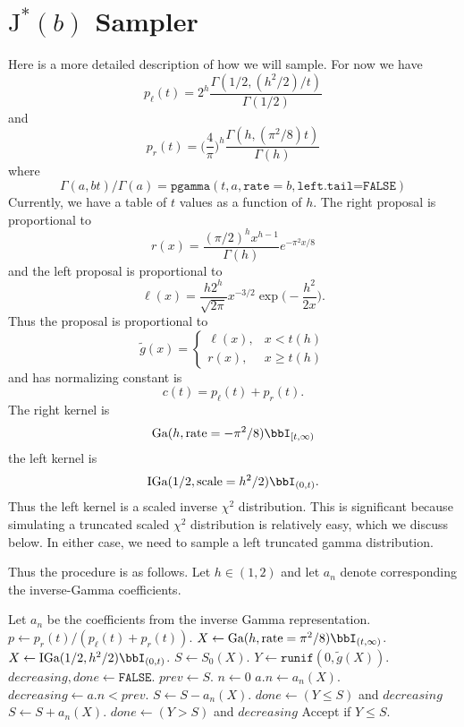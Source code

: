 \documentclass[12pt]{article}
\newcommand{\JJ}{\mbox{J}^*}
\begin{document}
\section{$\JJ(b)$ Sampler}

Here is a more detailed description of how we will sample.  For now we have
\[
p_\ell(t) = 2^h \frac{\Gamma(1/2, (h^2/2) / t)}{\Gamma(1/2)}
\]
and
\[
p_r(t) = \Big( \frac{4}{\pi} \Big)^h \frac{\Gamma(h, (\pi^2/8) t)}{\Gamma(h)}
\]
where
\[
\Gamma(a,bt) / \Gamma(a) = \texttt{pgamma}(t, a, \texttt{rate}=b,
\texttt{left.tail=FALSE})
\]
Currently, we have a table of $t$ values as a function of $h$.  The right
proposal is proportional to 
\[
r(x) = \frac{(\pi/2)^h x^{h-1}}{\Gamma(h)} e^{-\pi^2 x / 8}
\]
and the left proposal is proportional to
\[
\ell(x) = \frac{h 2^h}{\sqrt{2\pi}} x^{-3/2} \exp \Big( - \frac{h^2}{2x} \Big).
\]
Thus the proposal is proportional to
\[
\tilde g(x) = 
\begin{cases}
\ell(x), & x < t(h) \\
r(x), & x \geq t(h)
\end{cases}
\]
and has normalizing constant is
\[
c(t) = p_\ell(t) + p_r(t).
\]
The right kernel is 
\[
\text{Ga}(h, \text{rate}=-\pi^2/8) \bbI_{[t,\infty)}
\]
the left kernel is 
\[
\text{IGa}(1/2, \text{scale}=h^2/2) \bbI_{(0,t)}.
\]
Thus the left kernel is a scaled inverse $\chi^2$ distribution.  This is
significant because simulating a truncated scaled $\chi^2$ distribution is
relatively easy, which we discuss below.  In either case, we need to sample a
left truncated gamma distribution.

Thus the procedure is as follows.  Let $h \in (1,2)$ and let $a_n$ denote
corresponding the inverse-Gamma coefficients.

\begin{algorithm}
\begin{algorithmic}
\State Let $a_n$ be the coefficients from the inverse Gamma representation.
\State $p \gets p_r(t) / (p_\ell(t) + p_r(t))$.
  \State $X \gets \text{Ga}(h, \text{rate}=\pi^2/8) \bbI_{(t,\infty)}$.
\Else
  \State $X \gets \text{IGa}(1/2, h^2/2) \bbI_{(0,t)}$.
\EndIf
\State $S \gets S_0(X)$.
\State $Y \gets \texttt{runif}(0, \tilde g(X))$.
\State $decreasing, done \gets\texttt{FALSE}$.
\State $prev \gets S$.
\State $n \gets 0$
\State $a.n \gets a_n(X)$.
\State $decreasing \gets a.n < prev$.
  \State $S \gets S - a_n(X)$.
  \State $done \gets (Y \leq S)$ and $decreasing$
\Else %
  \State $S \gets S + a_n(X)$.
  \State $done \gets (Y > S)$ and $decreasing$
\EndIf
\EndWhile
\State Accept if $Y \leq S$.
\end{algorithmic}
\end{algorithm}
\end{document}
